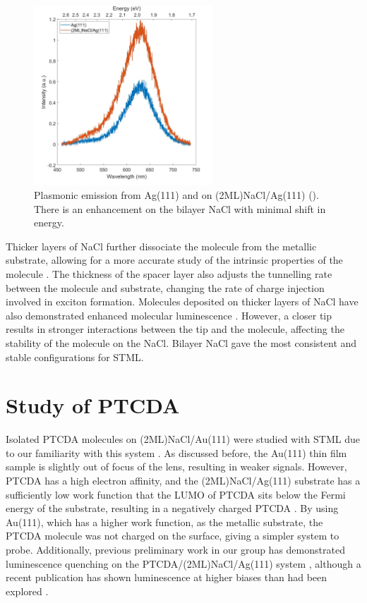 \begin{figure} [h]
    \centering
    \includegraphics[width=0.6\textwidth]{pictures/NaCl_enhancement_Ag111_275V_250pA_10s.jpg}
    \caption{Plasmonic emission from Ag(111) and on (2ML)NaCl/Ag(111) (). There is an enhancement on the bilayer NaCl with minimal shift in energy. }
    \label{fig:opv:nacl-plasmon}
\end{figure}

Thicker layers of NaCl further dissociate the molecule from the metallic substrate, allowing for a more accurate study of the intrinsic properties of the molecule \citep{repp2005molecules}. The thickness of the spacer layer also adjusts the tunnelling rate between the molecule and substrate, changing the rate of charge injection involved in exciton formation. Molecules deposited on thicker layers of NaCl have also demonstrated enhanced molecular luminescence \citep{Zhang2017,Kroger2018}. However, a closer tip results in stronger interactions between the tip and the molecule, affecting the stability of the molecule on the NaCl. Bilayer NaCl gave the most consistent and stable configurations for \ac{STML}.



\section{Study of PTCDA}

Isolated \ac{PTCDA} molecules on (2ML)NaCl/Au(111) were studied with \ac{STML} due to our familiarity with this system \citep{roussy2016coupling, cochrane2018molecularly}. As discussed before, the Au(111) thin film sample is slightly out of focus of the lens, resulting in weaker signals. However, \ac{PTCDA} has a high electron affinity, and the (2ML)NaCl/Ag(111) substrate has a sufficiently low work function that the \ac{LUMO} of PTCDA sits below the Fermi energy of the substrate, resulting in a negatively charged PTCDA \citep{cochrane2017single,cochrane2018molecularly}. By using Au(111), which has a higher work function, as the metallic substrate, the PTCDA molecule was not charged on the surface, giving a simpler system to probe. Additionally, previous preliminary work in our group has demonstrated luminescence quenching on the PTCDA/(2ML)NaCl/Ag(111) system \citep{roussy2016coupling}, although a recent publication has shown luminescence at higher biases than had been explored \citep{Kimura2019}.

